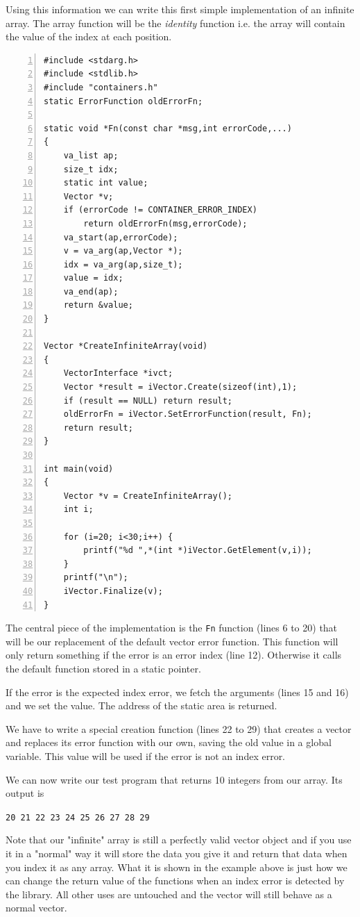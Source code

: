 \documentclass[12pt,a4paper]{memoir} %
\begin{document}
{{Using this information we can write this first simple implementation of an infinite array. The array function will be the \textsl{identity} function
i.e. the array will contain the value of the index at each position.
\begin{Verbatim}[numbers=left]
#include <stdarg.h>
#include <stdlib.h>
#include "containers.h"
static ErrorFunction oldErrorFn;

static void *Fn(const char *msg,int errorCode,...)
{
    va_list ap;
    size_t idx;
    static int value;
    Vector *v;
    if (errorCode != CONTAINER_ERROR_INDEX)
        return oldErrorFn(msg,errorCode);
    va_start(ap,errorCode);
    v = va_arg(ap,Vector *);
    idx = va_arg(ap,size_t);
    value = idx;
    va_end(ap);
    return &value;
}

Vector *CreateInfiniteArray(void)
{
    VectorInterface *ivct;
    Vector *result = iVector.Create(sizeof(int),1);
    if (result == NULL) return result;
    oldErrorFn = iVector.SetErrorFunction(result, Fn);
    return result;
}

int main(void)
{
    Vector *v = CreateInfiniteArray();
    int i;

    for (i=20; i<30;i++) {
        printf("%d ",*(int *)iVector.GetElement(v,i));
    }
    printf("\n");
    iVector.Finalize(v);
}

\end{Verbatim}
The central piece of the implementation is the \verb,Fn, function (lines 6 to 20) 
that will be our replacement of the default vector error function. This function
will only return something if the error is an error index (line 12). Otherwise it calls the default function stored in a static pointer.

If the error is the expected index error, we fetch the arguments (lines 15 and 16) and we set the value. 
The address of the static area is returned.

We have to write a special creation function (lines 22 to 29) that creates a vector and replaces its error function 
with our own, saving the old
value in a global variable. This value will be used if the error is not an index error.

We can now write our test program that returns 10 integers from our array. Its output is\par
\verb,20 21 22 23 24 25 26 27 28 29 ,

Note that our "infinite" array is still a perfectly valid vector object and if you use it in a "normal" way it will store the data you give it and 
return that data when you index it as any array. What it is shown in the example above is just how we can change the return value of the functions when 
an index error is detected by the library. All other uses are untouched and the vector will still behave as a normal vector.

}}
\end{document}
